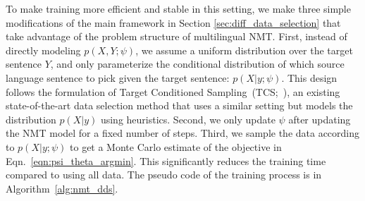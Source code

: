 To make training more efficient and stable in this setting, we make three simple modifications of the main framework in Section \ref{sec:diff_data_selection} that take advantage of the problem structure of multilingual NMT.
First, instead of directly modeling $p(X,Y;\psi)$, we assume a uniform distribution over the target sentence $Y$, %
and only parameterize the conditional distribution of which source language sentence to pick given the target sentence: $p(X|y;\psi)$. This design follows the formulation of Target Conditioned Sampling~(TCS;~\citet{TCS}), an existing state-of-the-art data selection method that uses a similar setting but models the distribution $p(X|y)$ using heuristics.
Second, we only update $\psi$ after updating the NMT model for a fixed number of steps.
Third, we sample the data according to $p(X|y;\psi)$ to get a Monte Carlo estimate of the objective in Eqn.~\ref{eqn:psi_theta_argmin}.
This significantly reduces the training time compared to using all data.
The pseudo code of the training process is in Algorithm~\ref{alg:nmt_dds}.


 
